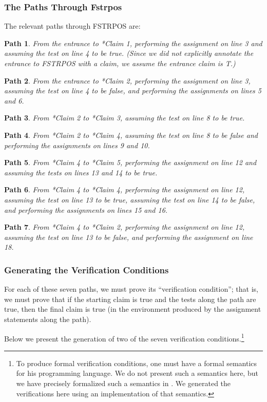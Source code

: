 \documentclass[11pt]{book}
\newtheorem{path}{Path}
\newcommand{\pubdefaulttextsize}{\large}
\begin{document}
\subsubsection{The Paths Through Fstrpos}
\pubdefaulttextsize
The relevant paths through FSTRPOS are:
\begin{path}From the entrance to *Claim 1,
performing the assignment on line 3 and
assuming the test on line 4 to be true.  (Since we did not
explicitly annotate the entrance to FSTRPOS with a claim,
we assume the entrance claim is T.)
\end{path}
\begin{path}From the entrance to *Claim 2,
performing the assignment on line 3,
assuming the test on line 4 to be false, and
performing the assignments on lines 5 and 6.
\end{path}
\begin{path}From *Claim 2 to *Claim 3,
assuming the test on line 8 to be true.
\end{path}
\begin{path}From *Claim 2 to *Claim 4,
assuming the test on line 8 to be false and performing
the assignments on lines 9 and 10.
\end{path}
\begin{path}From *Claim 4 to *Claim 5,
performing the assignment on line 12 and assuming
the tests on lines 13 and 14 to be true.
\end{path}
\begin{path}From *Claim 4 to *Claim 4,
performing the assignment on line 12, assuming
the test on line 13 to be true, assuming the test on line 14 to be false,
and performing the assignments on lines 15 and 16.
\end{path}
\begin{path}From *Claim 4 to *Claim 2,
performing the assignment on line 12, assuming
the test on line 13 to be false, and performing the assignment
on line 18.
\end{path}
\subsubsection{Generating the Verification Conditions}
\pubdefaulttextsize
For each of these seven paths, we must prove its
``verification condition''; that is, we must prove that if the
starting claim is true and the tests along the path are
true, then the final claim is true (in the environment
produced by the assignment statements along the path). 

Below we present the generation of two of the seven verification
conditions.\footnote{To produce formal verification conditions, one must have a formal semantics for his programming language.  We do not present such a semantics here, but we have precisely formalized such a semantics in \cite{METHDOC}.  We generated the verifications here using an implementation of that semantics.}
\end{document}
